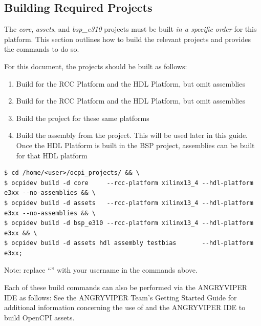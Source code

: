 \begin{flushleft}
\subsection{Building Required Projects}
\label{sec:Building OpenCPI projects}
The \textit{core}, \textit{assets}, and \textit{bsp\_e310} projects must be built \textit{in a specific order} for this platform. This section outlines how to build the relevant projects and provides the commands to do so.\medskip

For this document, the projects should be built as follows:\\

\begin{enumerate}
	\item Build  for the  RCC Platform and the  HDL Platform, but omit assemblies
	\item Build  for the  RCC Platform and the  HDL Platform, but omit assemblies
	\item Build the  project for these same platforms
	\item Build the  assembly from the  project. This will be used later in this guide.
		\subitem Once the HDL Platform is built in the BSP project, assemblies can be built for that HDL platform
\end{enumerate}
\begin{lstlisting}[showspaces=false]
$ cd /home/<user>/ocpi_projects/ && \
$ ocpidev build -d core     --rcc-platform xilinx13_4 --hdl-platform e3xx --no-assemblies && \
$ ocpidev build -d assets   --rcc-platform xilinx13_4 --hdl-platform e3xx --no-assemblies && \
$ ocpidev build -d bsp_e310 --rcc-platform xilinx13_4 --hdl-platform e3xx && \
$ ocpidev build -d assets hdl assembly testbias       --hdl-platform e3xx;
\end{lstlisting}
Note: replace ``\code{<user>}'' with your username in the commands above.\\\medskip

Each of these build commands can also be performed via the ANGRYVIPER IDE as follows:
\OcpidevBuild
See the ANGRYVIPER Team's Getting Started Guide for additional information concerning the use of  and the ANGRYVIPER IDE to build OpenCPI assets.


\end{flushleft}
